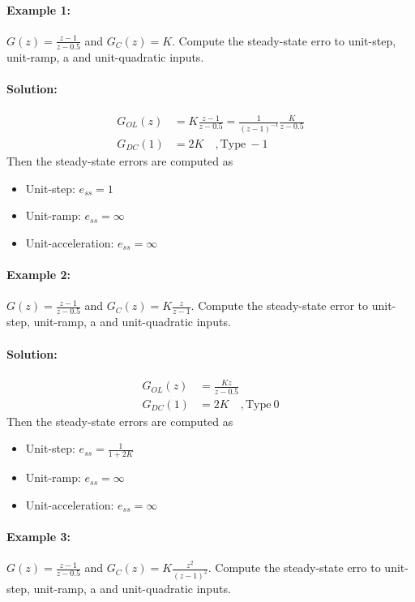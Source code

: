 \documentclass[twoside]{article}
\begin{document}
\paragraph{Example 1:} $G(z) = \frac{z-1}{z-0.5}$ and $G_C(z) =
K$. Compute the steady-state erro to unit-step, unit-ramp, a
and unit-quadratic inputs.

\paragraph{Solution:} 
%
\begin{align*}
G_{OL}(z) &= K \frac{z-1}{z-0.5} = \frac{1}{(z-1)^{-1}} \frac{K}{z-0.5}
\\
G_{DC}(1) &= 2 K \quad, \mathrm{Type} \ -1 
\end{align*}
%
Then the steady-state errors are computed as
\begin{itemize}
\item Unit-step: $e_{ss} = 1$
\item Unit-ramp: $e_{ss} = \infty$
\item Unit-acceleration: $e_{ss} = \infty$
\end{itemize}

\paragraph{Example 2:} $G(z) = \frac{z-1}{z-0.5}$ and $G_C(z) =
K \frac{z}{z-1}$. Compute the steady-state error to unit-step, unit-ramp, a
and unit-quadratic inputs.

\paragraph{Solution:} 
%
\begin{align*}
G_{OL}(z) &= \frac{K z}{z-0.5} 
\\
G_{DC}(1) &= 2 K \quad, \mathrm{Type} \ 0 
\end{align*}
%
Then the steady-state errors are computed as
%
\begin{itemize}
\item Unit-step: $e_{ss} = \frac{1}{1 + 2 K}$
\item Unit-ramp: $e_{ss} = \infty$
\item Unit-acceleration: $e_{ss} = \infty$
\end{itemize}

\paragraph{Example 3:} $G(z) = \frac{z-1}{z-0.5}$ and $G_C(z) =
K \frac{z^2}{(z-1)^2}$. Compute the steady-state erro to unit-step, unit-ramp, a
and unit-quadratic inputs.
\end{document}
